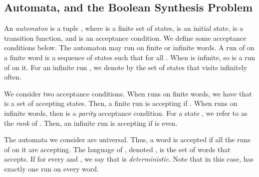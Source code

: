 \documentclass[runningheads,a4paper]{llncs}
\newcommand{\stam}[1]{}
\begin{document}
\subsection{Automata, and the Boolean Synthesis Problem}
\label{sec:application defs}
\stam{
For finite sets  and  of input and output signals, respectively, an {\em   transducer} is , where  is a set of states,  is an initial state,  is a total (deterministic) transition function, and  is a labeling function on the states. The run of  on a word  is the sequence of states  such that  for all . The {\em output} of  on  is then  where  for all . Note that the first output assignment is that of , and we do not consider . This reflects the fact that the environment initiates the interaction. The {\em computation of  on \/} is then 
.
When  is a finite set, we say that the transducer is  finite.

The synthesis problem gets as input a specification  and generates a transducer  that realizes ; namely, all the computations of  are in . The language  is typically given by an LTL formula \cite{Pnu81} or by means of an automaton of infinite words. 
}

An {\em automaton\/} is a tuple 
 , where  is a finite set of states,  is an initial state,  is a transition function, and 
 is an acceptance condition. We define some acceptance conditions below.
The automaton  may run on finite or infinite words. 
A run of  on a finite word  is a sequence of states  such that  for all . When  is infinite, so is a run of  on it. For an infinite run , we denote by  the set of states that  visits infinitely often.
 
We consider two acceptance conditions. When  runs on finite words, we have that  is a set of accepting states. Then, a finite run  is accepting if . When  runs on infinite words, then  is a {\em parity\/} acceptance condition. For a state , we refer to  as the {\em rank} of . Then, an infinite run  is accepting if  is even.

The automata we consider are universal. Thus, 
a word  is accepted if all the runs of  on it are accepting.  
The language of , denoted , is the set of words that  accepts. 
If  for every  and , we say that  is {\em deterministic}. Note that in this case,  has exactly one run on every word.
\end{document}
